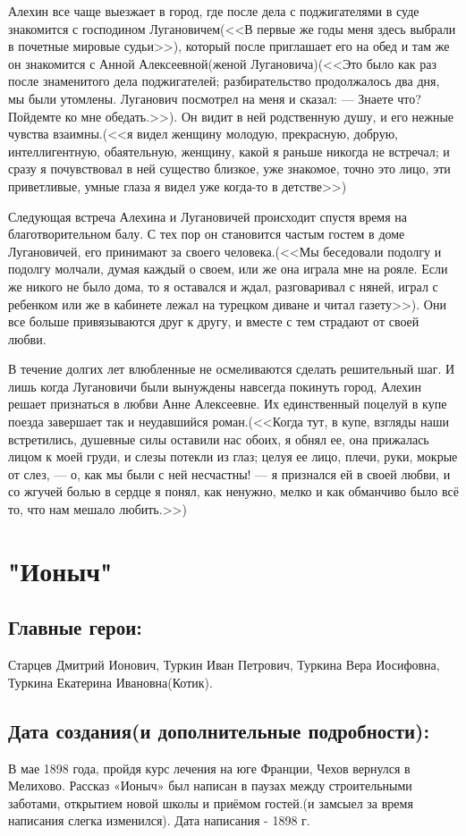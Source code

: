 \documentclass[a4paper,12pt]{article}
\begin{document}
	Алехин все чаще выезжает в город, где после дела с поджигателями в суде знакомится с господином Лугановичем(<<В первые же годы меня здесь выбрали в почетные мировые судьи>>), который после приглашает его на обед и там же он знакомится с Анной Алексеевной(женой Лугановича)(<<Это было как раз после знаменитого дела поджигателей; разбирательство продолжалось два дня, мы были утомлены. Луганович посмотрел на меня и сказал:
	 — Знаете что? Пойдемте ко мне обедать.>>).
	Он видит в ней родственную душу, и его нежные чувства взаимны.(<<я видел женщину молодую, прекрасную, добрую, интеллигентную, обаятельную, женщину, какой я раньше никогда не встречал; и сразу я почувствовал в ней существо близкое, уже знакомое, точно это лицо, эти приветливые, умные глаза я видел уже когда-то в детстве>>)
	
	
	Следующая встреча Алехина и Лугановичей происходит спустя время на благотворительном балу. С тех пор он становится частым гостем в доме Лугановичей, его принимают за своего человека.(<<Мы беседовали подолгу и подолгу молчали, думая каждый о своем, или же она играла мне на рояле. Если же никого не было дома, то я оставался и ждал, разговаривал с няней, играл с ребенком или же в кабинете лежал на турецком диване и читал газету>>). Они все больше привязываются друг к другу, и вместе с тем страдают от своей любви.
	
	
	В течение долгих лет влюбленные не осмеливаются сделать решительный шаг. И лишь когда Лугановичи были вынуждены навсегда покинуть город, Алехин решает признаться в любви Анне Алексеевне. Их единственный поцелуй в купе поезда завершает так и неудавшийся роман.(<<Когда тут, в купе, взгляды наши встретились, душевные силы оставили нас обоих, я обнял ее, она прижалась лицом к моей груди, и слезы потекли из глаз; целуя ее лицо, плечи, руки, мокрые от слез, — о, как мы были с ней несчастны! — я признался ей в своей любви, и со жгучей болью в сердце я понял, как ненужно, мелко и как обманчиво было всё то, что нам мешало любить.>>)
	
	\section{"Ионыч"}
	\subsection{Главные герои: }
	Старцев Дмитрий Ионович, Туркин Иван Петрович, Туркина Вера Иосифовна, Туркина Екатерина Ивановна(Котик).
	\subsection{Дата создания(и дополнительные подробности): }
	В мае 1898 года, пройдя курс лечения на юге Франции, Чехов вернулся в Мелихово. Рассказ «Ионыч» был написан в паузах между строительными заботами, открытием новой школы и приёмом гостей.(и замсыел за время написания слегка изменился).
	\noindent
	Дата написания - 1898 г.
	
\end{document}
